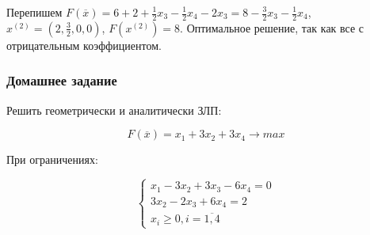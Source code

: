 \documentclass{article}
\begin{document}
Перепишем $F(\overline{x}) = 6 + 2 + \frac{1}{2} x_3 - \frac{1}{2} x_4 - 2x_3 = 8 - \frac{3}{2} x_3 - \frac{1}{2} x_4$, $x^{(2)} = (2, \frac{3}{2}, 0, 0)$, $F(x^{(2)}) = 8$. Оптимальное решение, так как все с отрицательным коэффициентом.

\subsubsection{Домашнее задание}

Решить геометрически и аналитически ЗЛП:

$$
F(\overline{x}) = x_1 + 3x_2 + 3x_4 \to max
$$

При ограничениях:

$$
\begin{cases}
    x_1 - 3x_2 + 3x_3 - 6x_4 = 0 \\
    3x_2 - 2x_3 + 6x_4 = 2 \\
    x_{i} \ge 0, i = \overline{1, 4}
\end{cases}
$$
\end{document}
